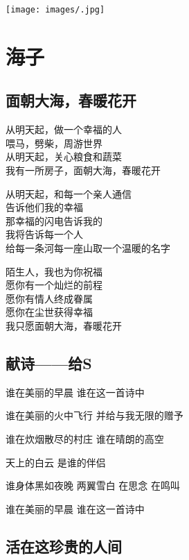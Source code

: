 \documentclass[
]{book}
\renewenvironment{quote}{\begin{VF}}{\end{VF}}
\begin{document}
\texttt{[image: images/.jpg]}

\hypertarget{section-21}{%
\chapter{海子}\label{section-21}}

\hypertarget{section-22}{%
\section{面朝大海，春暖花开}\label{section-22}}

\begin{quote}
从明天起，做一个幸福的人\\
喂马，劈柴，周游世界\\
从明天起，关心粮食和蔬菜\\
我有一所房子，面朝大海，春暖花开

从明天起，和每一个亲人通信\\
告诉他们我的幸福\\
那幸福的闪电告诉我的\\
我将告诉每一个人\\
给每一条河每一座山取一个温暖的名字

陌生人，我也为你祝福\\
愿你有一个灿烂的前程\\
愿你有情人终成眷属\\
愿你在尘世获得幸福\\
我只愿面朝大海，春暖花开
\end{quote}

\hypertarget{s}{%
\section{献诗------给S}\label{s}}

\begin{quote}
谁在美丽的早晨
谁在这一首诗中

谁在美丽的火中飞行
并给与我无限的赠予

谁在炊烟散尽的村庄
谁在晴朗的高空

天上的白云
是谁的伴侣

谁身体黑如夜晚 两翼雪白
在思念 在鸣叫

谁在美丽的早晨
谁在这一首诗中
\end{quote}

\hypertarget{section-23}{%
\section{活在这珍贵的人间}\label{section-23}}
\end{document}
